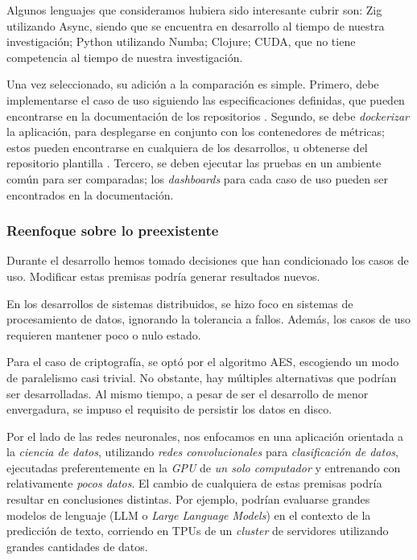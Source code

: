 \documentclass[11pt]{article}
\let\Oldsubsubsection\subsubsection
\renewcommand{\subsubsection}{\FloatBarrier\Oldsubsubsection}
\newcommand{\english}[1]{\textit{#1}}
\begin{document}
Algunos lenguajes que consideramos hubiera sido interesante cubrir son:
Zig utilizando Async, siendo que se encuentra en desarrollo al tiempo de nuestra investigación;
Python utilizando Numba;
Clojure;
CUDA, que no tiene competencia al tiempo de nuestra investigación.

Una vez seleccionado, su adición a la comparación es simple. Primero, debe implementarse el caso de uso siguiendo las especificaciones definidas, que pueden encontrarse en la documentación de los repositorios \cite{repos:docs}. Segundo, se debe \textit{dockerizar} la aplicación, para desplegarse en conjunto con los contenedores de métricas; estos pueden encontrarse en cualquiera de los desarrollos, u obtenerse del repositorio plantilla \cite{repos:template}. Tercero, se deben ejecutar las pruebas en un ambiente común para ser comparadas; los \english{dashboards} para cada caso de uso pueden ser encontrados en la documentación.

\subsubsection{Reenfoque sobre lo preexistente}

Durante el desarrollo hemos tomado decisiones que han condicionado los casos de uso. Modificar estas premisas podría generar resultados nuevos.

En los desarrollos de sistemas distribuidos, se hizo foco en sistemas de procesamiento de datos, ignorando la tolerancia a fallos. Además, los casos de uso requieren mantener poco o nulo estado.

Para el caso de criptografía, se optó por el algoritmo AES, escogiendo un modo de paralelismo casi trivial. No obstante, hay múltiples alternativas que podrían ser desarrolladas. Al mismo tiempo, a pesar de ser el desarrollo de menor envergadura, se impuso el requisito de persistir los datos en disco.

Por el lado de las redes neuronales, nos enfocamos en una aplicación orientada a la \textit{ciencia de datos}, utilizando \textit{redes convolucionales} para \textit{clasificación de datos}, ejecutadas preferentemente en la \textit{GPU} de \textit{un solo computador} y entrenando con relativamente \textit{pocos datos}. El cambio de cualquiera de estas premisas podría resultar en conclusiones distintas. Por ejemplo, podrían evaluarse grandes modelos de lenguaje (LLM o \english{Large Language Models}) en el contexto de la predicción de texto, corriendo en TPUs de un \english{cluster} de servidores utilizando grandes cantidades de datos.
\end{document}
